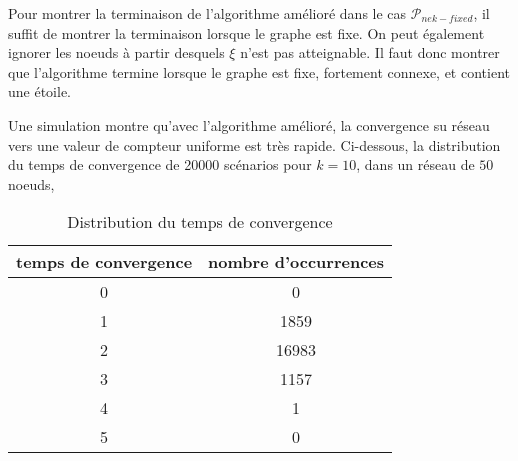 \documentclass{article}
\begin{document}
Pour montrer la terminaison de l'algorithme amélioré dans le cas $\mathcal{P}_{nek-fixed}$, il suffit de montrer la terminaison lorsque le graphe est fixe.
On peut également ignorer les noeuds à partir desquels $\xi$ n'est pas atteignable. Il faut donc montrer que l'algorithme termine lorsque le graphe est fixe, fortement connexe, et contient une étoile.

Une simulation montre qu'avec l'algorithme amélioré, la convergence su réseau vers une valeur de compteur uniforme est très rapide.
Ci-dessous, la distribution du temps de convergence de 20000 scénarios pour $k = 10$, dans un réseau de $50$ noeuds, 

\begin{table}[ht]
	\begin{center}
	\caption{Distribution du temps de convergence}
	\label{tab:table1}
	\begin{tabular}{c|c} %
		\textbf{temps de convergence} & \textbf{nombre d'occurrences}\\
		\hline
		0 & 0\\
		1 & 1859\\
		2 & 16983\\
		3 & 1157\\
		4 & 1\\
		5 & 0\\
		\end{tabular}
	\end{center}
\end{table}
\end{document}
